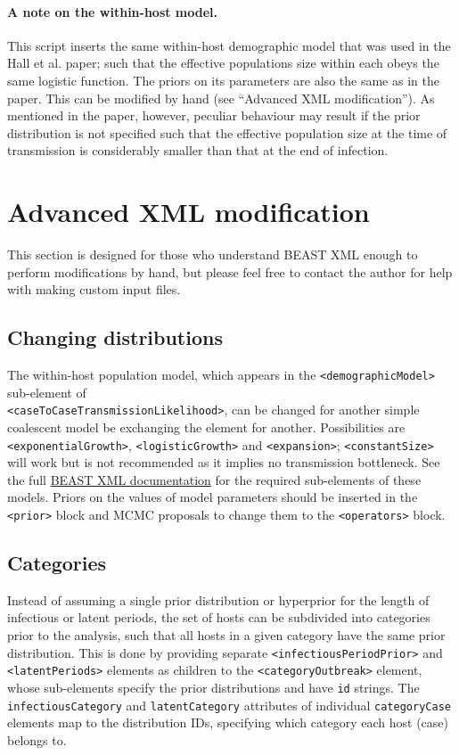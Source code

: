 \documentclass[]{article}
\begin{document}
\paragraph{A note on the within-host model.} This script inserts the same within-host demographic model that was used in the Hall et al. paper; such that the effective populations size within each obeys the same logistic function. The priors on its parameters are also the same as in the paper. This can be modified by hand (see ``Advanced XML modification''). As mentioned in the paper, however, peculiar behaviour may result if the prior distribution is not specified such that the effective population size at the time of transmission is considerably smaller than that at the end of infection.

\section{Advanced XML modification}

This section is designed for those who understand BEAST XML enough to perform modifications by hand, but please feel free to contact the author for help with making custom input files. 

\subsection*{Changing distributions}

The within-host population model, which appears in the {\tt <demographicModel>} sub-element of \\{\tt <caseToCaseTransmissionLikelihood>}, can be changed for another simple coalescent model be exchanging the {\tt <logisticGrowthN0>} element for another. Possibilities are {\tt <exponentialGrowth>}, {\tt <logisticGrowth>} and {\tt <expansion>}; {\tt <constantSize>} will work but is not recommended as it implies no transmission bottleneck. See the full \href{http://beast.bio.ed.ac.uk/XML-format}{BEAST XML documentation} for the required sub-elements of these models. Priors on the values of model parameters should be inserted in the {\tt <prior>} block and MCMC proposals to change them to the {\tt <operators>} block.

\subsection*{Categories}

Instead of assuming a single prior distribution or hyperprior for the length of infectious or latent periods, the set of hosts can be subdivided into categories prior to the analysis, such that all hosts in a given category have the same prior distribution. This is done by providing separate {\tt <infectiousPeriodPrior>} and {\tt <latentPeriods>} elements as children to the {\tt <categoryOutbreak>} element, whose sub-elements specify the prior distributions and have {\tt id} strings. The {\tt infectiousCategory} and {\tt latentCategory} attributes of individual {\tt categoryCase} elements map to the distribution IDs, specifying which category each host (case) belongs to.
\end{document}
